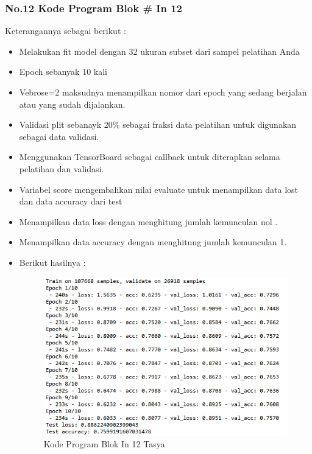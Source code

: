 \subsubsection{No.12 Kode Program Blok \# In 12}

Keterangannya sebagai berikut :\\
\begin{itemize}
\item Melakukan fit model dengan 32 ukuran subset dari sampel pelatihan Anda
\item Epoch sebanyak 10 kali
\item Vebrose=2 maksudnya menampilkan nomor dari epoch yang sedang berjalan atau yang sudah dijalankan.
\item Validasi plit sebanayk 20\% sebagai fraksi data pelatihan untuk digunakan sebagai data validasi.
\item Menggunakan TensorBoard sebagai callback untuk diterapkan selama pelatihan dan validasi.
\item Variabel score mengembalikan nilai evaluate untuk menampilkan data lost dan data accuracy dari test
\item Menampilkan data loss dengan menghitung jumlah kemunculan nol .
\item Menampilkan data accuracy dengan menghitung jumlah kemunculan 1.
\item Berikut hasilnya :\\
\begin{figure}[ht]
\centering
\includegraphics[scale=0.5]{figures/Chapter 7/1164086/Praktek/chapter7tasya25.png}
\caption{Kode Program Blok In 12 Tasya}
\label{Praktek}
\end{figure}
\end{itemize}

